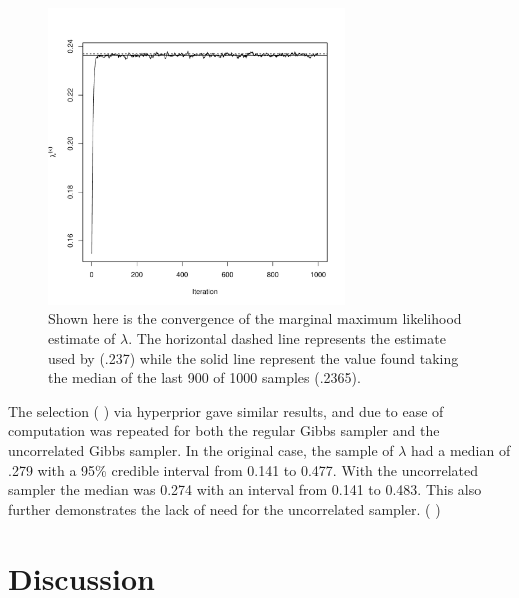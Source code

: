 \documentclass{uwstat572}
\newcommand{\vmadd}[1]{\textbf{\color{red}{#1}}}
\newcommand{\vmcomment}[1]{({\color{blue}{VM's comment:}} \textbf{\color{blue}{#1}})}
\begin{document}
\begin{figure}\label{lambda}
  \centering
    \includegraphics[width=0.7\textwidth]{SaveLambdaConverge.pdf}
  \caption{Shown here is the convergence of the marginal maximum likelihood estimate of $\lambda$. The horizontal dashed line represents the estimate used by \cite{park2008bayesian} (.237) while the solid line represent the value found taking the median of the last 900 of 1000 samples (.2365).}
\end{figure}

The selection \vmcomment{of $\lambda$?} via hyperprior gave similar results, and due to ease of computation was repeated for both the regular Gibbs sampler and the uncorrelated Gibbs sampler. In the original case, the sample of $\lambda$ had a median of \vmadd{0}.279 with a 95\% credible interval from 0.141 to 0.477. With the uncorrelated sampler the median was 0.274 with an interval from 0.141 to 0.483. This also further demonstrates the lack of need for the uncorrelated sampler.
\vmcomment{This discussion about $\lambda$ needs work; I have hard time figuring out what you are trying to say; sharpen your message.}

\section{Discussion}


\end{document}
